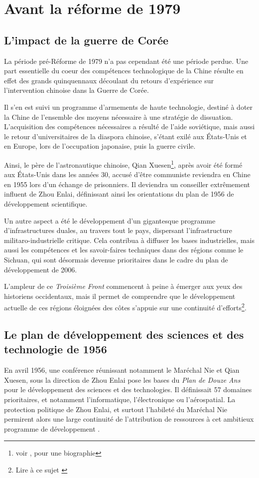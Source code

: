 \documentclass[a4paper]{article}
\begin{document}
\section{Avant la réforme de 1979}
\label{sec:org112d285}
\subsection{L’impact de la guerre de Corée}
\label{sec:org77dd9e3}
La période pré-Réforme de 1979 n’a pas cependant été une période perdue. Une part essentielle du coeur des compétences technologique de la Chine résulte en effet des grands quinquennaux découlant du retours d’expérience sur l’intervention chinoise dans la Guerre de Corée.

Il s’en est suivi un programme d’armements de haute technologie, destiné à doter la Chine de l’ensemble des moyens nécessaire à une stratégie de dissuation. L’acquisition des compétences nécessaires a résulté de l’aide soviétique, mais aussi le retour d’universitaires de la diaspora chinoise, s’étant exilé aux États-Unis et en Europe, lors de l’occupation japonaise, puis la guerre civile.

Ainsi, le père de l’astronautique chinoise, Qian Xuesen\footnote{voir \cite{chang95_thread}, pour une biographie}, après avoir été formé aux États-Unis dans les années 30, accusé d’être communiste reviendra en Chine en 1955 lors d’un échange de prisonniers. Il deviendra un conseiller extrêmement influent de Zhou Enlai, définissant ainsi les orientations du plan de 1956 de développement scientifique.

Un autre aspect a été le développement d’un gigantesque programme d’infra\-structures duales, au travers tout le pays, dispersant l’infrastructure militaro-industrielle critique. Cela contribua à diffuser les bases industrielles, mais aussi les compétences et les savoir-faires techniques dans des régions comme le Sichuan, qui sont désormais devenue prioritaires dans le cadre du plan de développement de 2006.

L’ampleur de ce \textit{Troisième Front} commencent à peine à émerger aux yeux des historiens occidentaux, mais il permet de comprendre que le développement actuelle de ces régions éloignées des côtes s’appuie sur une continuité d’efforts\footnote{Lire à ce sujet \cite{meyskens20_maos}}.


\subsection{Le plan de développement des sciences et des technologie de 1956}
\label{sec:org13d69c0}
En avril 1956, une conférence réunissant notamment le Maréchal Nie et Qian Xuesen, sous la direction de Zhou Enlai pose les bases du \textit{Plan de Douze Ans} pour le développement des sciences et des technologies. Il définissait 57 domaines prioritaires, et notamment l’informatique, l’électronique ou l’aérospatial. La protection politique de Zhou Enlai, et surtout l’habileté du Maréchal Nie permirent alors une large continuité de l’attribution de ressources à cet ambitieux programme de développement \cite{feigenbaum03_chinas}. 
\end{document}
